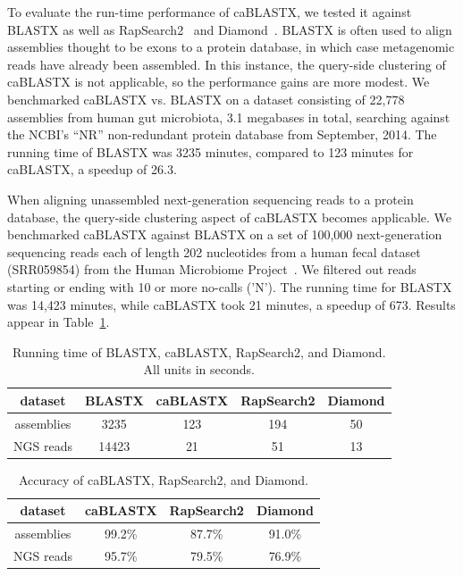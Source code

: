 \documentclass[review,preprint,12pt]{elsarticle}
\renewcommand{\cite}{\citep} %
\theoremstyle{definition}
\theoremstyle{remark}
\numberwithin{equation}{section}
\begin{document}
To evaluate the run-time performance of caBLASTX, we tested it against
BLASTX as well as RapSearch2~\cite{zhao2012rapsearch2} and
Diamond~\cite{buchfink2014fast}.
BLASTX is often used to align assemblies thought to be exons to a protein
database, in which case metagenomic reads have already been assembled.
In this instance, the query-side clustering of caBLASTX is not applicable, so
the performance gains are more modest.
We benchmarked caBLASTX vs. BLASTX on a dataset consisting of 22,778 assemblies
from human gut microbiota, 3.1 megabases in total, searching against the NCBI's
``NR'' non-redundant protein database from September, 2014.
The running time of BLASTX was 3235 minutes, compared to 123 minutes for 
caBLASTX, a speedup of 26.3.

When aligning unassembled next-generation sequencing reads to a protein 
database, the
query-side clustering aspect of caBLASTX becomes applicable.
We benchmarked caBLASTX against BLASTX on a set of 100,000
next-generation sequencing reads each of length 202 nucleotides from a human 
fecal dataset (SRR059854) from the
Human Microbiome Project~\cite{turnbaugh2007human}.
We filtered out reads starting or ending with 10 or more no-calls ('N').
The running time for BLASTX was 14,423 minutes, 
while caBLASTX took 21 minutes, a speedup of 673.
Results appear in Table~\ref{mgspeed}.



\begin{table}
\caption{Running time of BLASTX, caBLASTX, RapSearch2, and Diamond. All units in seconds.\label{mgspeed}}
\begin{tabular}{ccccc}
\hline
dataset & BLASTX & caBLASTX & RapSearch2 & Diamond \\
\hline
assemblies & 3235 & 123 & 194 & 50 \\
\hline
NGS reads & 14423 & 21 & 51 & 13 \\
\hline
\end{tabular}
\end{table}

\begin{table}
\caption{Accuracy of caBLASTX, RapSearch2, and Diamond.\label{mgacc}}
\begin{tabular}{cccc}
\hline
dataset & caBLASTX & RapSearch2 & Diamond \\
\hline
assemblies & 99.2\% & 87.7\% & 91.0\% \\
\hline
NGS reads & 95.7\% & 79.5\% & 76.9\% \\
\hline
\end{tabular}
\end{table}
\end{document}
